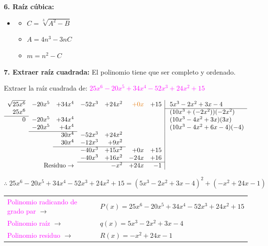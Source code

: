 \documentclass[11pt,a4paper]{article}
\begin{document}
\textbf{6. Raíz cúbica:}
\begin{itemize}[label=$\ast$]
  \item {}
  \begin{itemize}[label=\checkmark]
    \item $C = \sqrt[3]{A^2 - B}$
    \item $A = 4n^3 - 3nC$
    \item $m = n^2 - C$
  \end{itemize}
\end{itemize}

\textbf{7. Extraer raíz cuadrada:} El polinomio tiene que ser completo y ordenado.

Extraer la raíz cuadrada de: \textcolor{magenta}{$25x^6 - 20x^5 + 34x^4 - 52x^3 + 24x^2 + 15$}

{\small
\[
\begin{array}{rrrrrrr|l}
\sqrt{25x^6} & -20x^5 & +34x^4 & -52x^3 & +24x^2 & \textcolor{naranja}{+0x} & +15 & \;5x^3 - 2x^2 + 3x - 4\\ \cline{8-8}
25x^6 &        &        &        &        &     &     & \;(10x^3 + (-2x^2))(-2x^2)\\ \cline{1-1}
0     & -20x^5 & +34x^4 &        &        &     &     & \;(10x^3 - 4x^2 + 3x)(3x)\\
      & -20x^5 & +4x^4  &        &        &     &     & \;(10x^3 - 4x^2 + 6x - 4)(-4)\\ \cline{2-3}
      &        & 30x^4  & -52x^3 & +24x^2 &     &     & \\
      &        & 30x^4  & -12x^3 & +9x^2  &     &     & \\ \cline{3-5}
      &        &        & -40x^3 & +15x^2 & +0x & +15 & \\
      &        &        & -40x^3 & +16x^2 & -24x & +16 & \\ \cline{4-7}
\multicolumn{3}{r}{\text{Residuo} \rightarrow} & & -x^2 & +24x & -1 &
\end{array}
\]
}

\[\therefore\; 25x^6 - 20x^5 + 34x^4 - 52x^3 + 24x^2 + 15 = (5x^3 - 2x^2 + 3x - 4)^2 + (-x^2 + 24x - 1)\]

\begin{tabular}{@{}l@{\;}l}
\textcolor{magenta}{Polinomio radicando de grado par} $\rightarrow$ & $P(x) = 25x^6 - 20x^5 + 34x^4 - 52x^3 + 24x^2 + 15$\\
\textcolor{magenta}{Polinomio raíz} $\rightarrow$ & $q(x) = 5x^3 - 2x^2 + 3x - 4$\\
\textcolor{magenta}{Polinomio residuo} $\rightarrow$ & $R(x) = -x^2 + 24x - 1$
\end{tabular}
\end{document}
